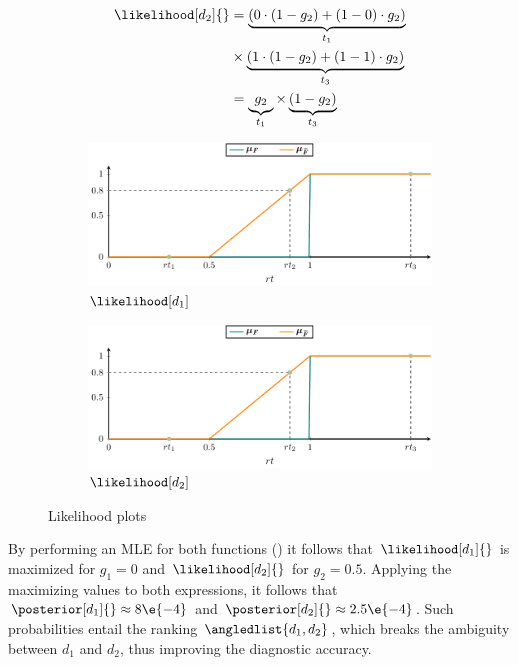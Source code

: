 \begin{equation}
  \begin{split}
    \likelihood[d_2]{} &= \underbrace{(0 \cdot (1-g_2) + (1- 0) \cdot g_2)}_{t_1} \\
    &\times \underbrace{(1 \cdot (1-g_2) + (1 - 1) \cdot g_2)}_{t_3}\\
    &= \underbrace{\vphantom{(}g_2}_{t_1} \times \underbrace{(1 - g_2)}_{t_3}
  \end{split}
\end{equation}

\begin{figure}[!ht]
  \begin{subfigure}{0.45\columnwidth}
    \includegraphics[page=7]{figures/fuzzinel/figures/main.pdf}
    \caption{$\likelihood[d_1]$}
  \end{subfigure}
  \begin{subfigure}{0.45\columnwidth}
    \includegraphics[page=8]{figures/fuzzinel/figures/main.pdf}
    \caption{$\likelihood[d_2]$}
  \end{subfigure}

  \caption{Likelihood plots \label{fig:fuzzinel:likelihood-plots}}
\end{figure}


By performing an \ac{MLE} for both functions
() it follows that
$\likelihood[d_1]{}$ is maximized for $g_1=0$ and $\likelihood[d_2]{}$
for $g_2 = 0.5$.
%
Applying the maximizing values to both expressions, it follows that
$\posterior[d_1]{} \approx 8\e{-4}$ and $\posterior[d_2]{} \approx 2.5\e{-4}$.
%
Such probabilities entail the ranking $\angledlist{d_1, d_2}$,
which breaks the ambiguity between $d_1$ and $d_2$, thus improving the
diagnostic accuracy.

